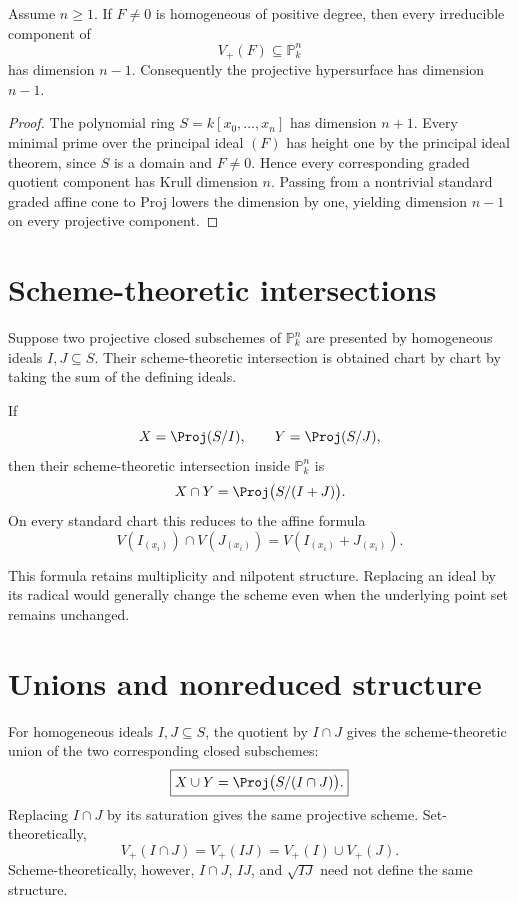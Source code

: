 \begin{theorem}\label{thm:vi37-hypersurface-dim}
Assume \(n\ge1\).  If \(F\ne0\) is homogeneous of positive degree, then every irreducible component of
\[
  V_+(F)\subseteq\mathbb P^n_k
\]
has dimension \(n-1\).  Consequently the projective hypersurface has dimension \(n-1\).
\end{theorem}

\begin{proof}
The polynomial ring \(S=k[x_0,\ldots,x_n]\) has dimension \(n+1\).  Every minimal prime over the principal ideal \((F)\) has height one by the principal ideal theorem, since \(S\) is a domain and \(F\ne0\).  Hence every corresponding graded quotient component has Krull dimension \(n\).  Passing from a nontrivial standard graded affine cone to Proj lowers the dimension by one, yielding dimension \(n-1\) on every projective component.
\end{proof}

\section{Scheme-theoretic intersections}
Suppose two projective closed subschemes of \(\mathbb P^n_k\) are presented by homogeneous ideals \(I,J\subseteq S\).  Their scheme-theoretic intersection is obtained chart by chart by taking the sum of the defining ideals.

\begin{proposition}\label{prop:vi37-intersection}
If
\[
  X=\Proj(S/I),\qquad Y=\Proj(S/J),
\]
then their scheme-theoretic intersection inside \(\mathbb P^n_k\) is
\[
  X\cap Y=\Proj\bigl(S/(I+J)\bigr).
\]
On every standard chart this reduces to the affine formula
\[
  V(I_{(x_i)})\cap V(J_{(x_i)})=V(I_{(x_i)}+J_{(x_i)}).
\]
\end{proposition}

This formula retains multiplicity and nilpotent structure.  Replacing an ideal by its radical would generally change the scheme even when the underlying point set remains unchanged.



\section{Unions and nonreduced structure}
For homogeneous ideals \(I,J\subseteq S\), the quotient by \(I\cap J\) gives the scheme-theoretic union of the two corresponding closed subschemes:
\[
  \boxed{X\cup Y=\Proj\bigl(S/(I\cap J)\bigr).}
\]
Replacing \(I\cap J\) by its saturation gives the same projective scheme.
Set-theoretically,
\[
  V_+(I\cap J)=V_+(IJ)=V_+(I)\cup V_+(J).
\]
Scheme-theoretically, however, \(I\cap J\), \(IJ\), and \(\sqrt{IJ}\) need not define the same structure.

